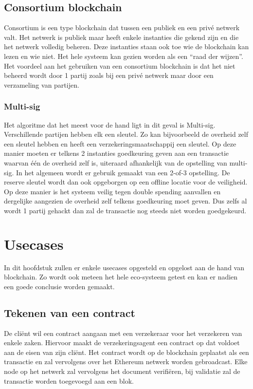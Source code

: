 \section{Consortium blockchain}
Consortium is een type blockchain dat tussen een publiek en een privé netwerk valt. Het netwerk is publiek maar heeft enkele instanties die gekend zijn en die het netwerk volledig beheren. Deze instanties staan ook toe wie de blockchain kan lezen en wie niet. Het hele systeem kan gezien worden als een ``raad der wijzen''. Het voordeel aan het gebruiken van een consortium blockchain is dat het niet beheerd wordt door 1 partij zoals bij een privé netwerk maar door een verzameling van partijen. 

\subsection{Multi-sig}
Het algoritme dat het meest voor de hand ligt in dit geval is Multi-sig. Verschillende partijen hebben elk een sleutel. Zo kan bijvoorbeeld de overheid zelf een sleutel hebben en heeft een verzekeringsmaatschappij een sleutel. Op deze manier moeten er telkens 2 instanties goedkeuring geven aan een transactie waarvan één de overheid zelf is, uiteraard afhankelijk van de opstelling van multi-sig. In het algemeen wordt er gebruik gemaakt van een 2-of-3 opstelling. De reserve sleutel wordt dan ook opgeborgen op een offline locatie voor de veiligheid. Op deze manier is het systeem veilig tegen double spending aanvallen en dergelijke aangezien de overheid zelf telkens goedkeuring moet geven. Dus zelfs al wordt 1 partij gehackt dan zal de transactie nog steeds niet worden goedgekeurd. 

\chapter{Usecases}
\label{ch:usecases}
In dit hoofdstuk zullen er enkele usecases opgesteld en opgelost aan de hand van blockchain. Zo wordt ook meteen het hele eco-systeem getest en kan er nadien een goede conclusie worden gemaakt.

\section{Tekenen van een contract}
De cliënt wil een contract aangaan met een verzekeraar voor het verzekeren van enkele zaken. Hiervoor maakt de verzekeringsagent een contract op dat voldoet aan de eisen van zijn cliënt. Het contract wordt op de blockchain geplaatst als een transactie en zal vervolgens over het Ethereum netwerk worden gebroadcast. Elke node op het netwerk zal vervolgens het document verifiëren, bij validatie zal de transactie worden toegevoegd aan een blok. 

